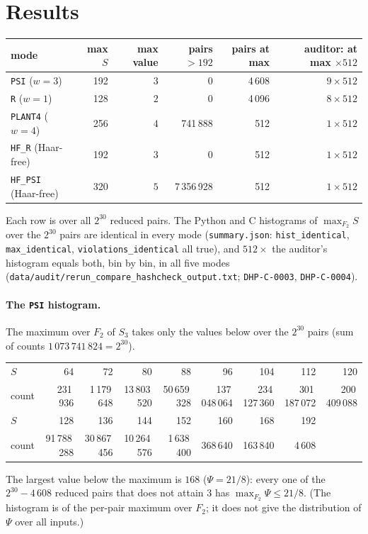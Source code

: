 \documentclass[10pt]{article}
\begin{document}
\section{Results}\label{sec:results}
\begin{center}\small\begin{tabular}{lrrrrr}\toprule
mode & max $S$ & max value & pairs $>192$ & pairs at max & auditor: at max $\times512$\\\midrule
\texttt{PSI} ($w=3$) & 192 & $3$ & 0 & 4\,608 & $9\times512$\\
\texttt{R} ($w=1$) & 128 & $2$ & 0 & 4\,096 & $8\times512$\\
\texttt{PLANT4} ($w=4$) & 256 & $4$ & 741\,888 & 512 & $1\times512$\\
\texttt{HF\_R} (Haar-free) & 192 & $3$ & 0 & 512 & $1\times512$\\
\texttt{HF\_PSI} (Haar-free) & 320 & $5$ & 7\,356\,928 & 512 & $1\times512$\\\bottomrule
\end{tabular}\end{center}
Each row is over all $2^{30}$ reduced pairs. The Python and C histograms of $\max_{F_2}S$ over the $2^{30}$ pairs are identical in every mode (\texttt{summary.json}: \texttt{hist\_identical}, \texttt{max\_identical}, \texttt{violations\_identical} all true), and $512\times$ the auditor's histogram equals both, bin by bin, in all five modes (\texttt{data/audit/rerun\_compare\_hashcheck\_output.txt}; \texttt{DHP-C-0003}, \texttt{DHP-C-0004}).

\paragraph{The \texttt{PSI} histogram.} The maximum over $F_2$ of $S_3$ takes only the values below over the $2^{30}$ pairs (sum of counts $1\,073\,741\,824=2^{30}$).
\begin{center}\scriptsize\setlength{\tabcolsep}{4pt}\begin{tabular}{lrrrrrrrr}\toprule
$S$ & 64&72&80&88&96&104&112&120\\
count & 231\,936 & 1\,179\,648 & 13\,803\,520 & 50\,659\,328 & 137\,048\,064 & 234\,127\,360 & 301\,187\,072 & 200\,409\,088\\\midrule
$S$ & 128&136&144&152&160&168&192&\\
count & 91\,788\,288 & 30\,867\,456 & 10\,264\,576 & 1\,638\,400 & 368\,640 & 163\,840 & 4\,608&\\\bottomrule\end{tabular}\end{center}
The largest value below the maximum is $168$ ($\Psi=21/8$): every one of the $2^{30}-4\,608$ reduced pairs that does not attain $3$ has $\max_{F_2}\Psi\le21/8$. (The histogram is of the per-pair maximum over $F_2$; it does not give the distribution of $\Psi$ over all inputs.)
\end{document}
